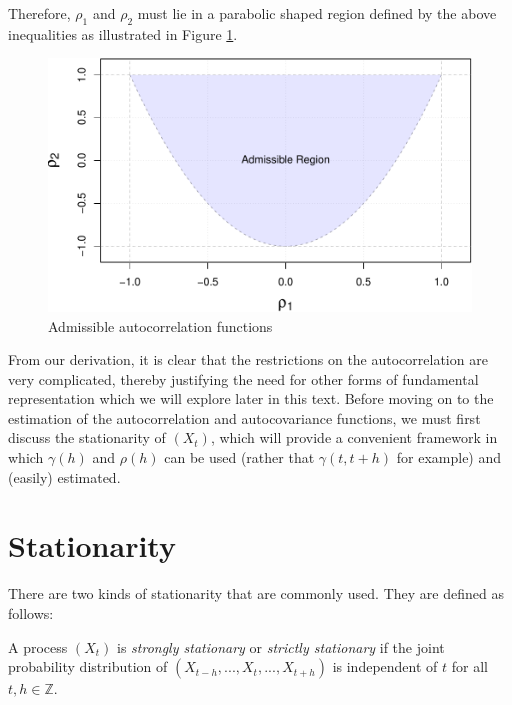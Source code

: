 \documentclass[]{book}
\theoremstyle{definition}
\theoremstyle{definition}
\theoremstyle{definition}
\theoremstyle{remark}
\let\BeginKnitrBlock\begin \let\EndKnitrBlock\end
\begin{document}
Therefore, \(\rho_1\) and \(\rho_2\) must lie in a parabolic shaped
region defined by the above inequalities as illustrated in Figure
\ref{fig:admissibility}.

\begin{figure}

{\centering \includegraphics{ts_files/figure-latex/admissibility-1} 

}

\caption{Admissible autocorrelation functions}\label{fig:admissibility}
\end{figure}

From our derivation, it is clear that the restrictions on the
autocorrelation are very complicated, thereby justifying the need for
other forms of fundamental representation which we will explore later in
this text. Before moving on to the estimation of the autocorrelation and
autocovariance functions, we must first discuss the stationarity of
\((X_t)\), which will provide a convenient framework in which
\(\gamma(h)\) and \(\rho(h)\) can be used (rather that \(\gamma(t,t+h)\)
for example) and (easily) estimated.

\hypertarget{stationary}{%
\section{Stationarity}\label{stationary}}

There are two kinds of stationarity that are commonly used. They are
defined as follows:

\BeginKnitrBlock{definition}
\protect\hypertarget{def:strongstationarity}{}{\label{def:strongstationarity}
}A process \((X_t)\) is \emph{strongly stationary} or \emph{strictly
stationary} if the joint probability distribution of
\((X_{t-h}, ..., X_t, ..., X_{t+h})\) is independent of \(t\) for all
\(t,h \in \mathbb{Z}\).
\EndKnitrBlock{definition}
\end{document}
